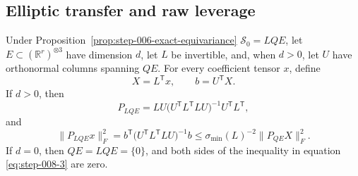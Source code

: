 \subsection{Elliptic transfer and raw leverage}\label{app:step-008}

\begin{lemma}
\label{lem:step-008-oblique-projection}
Under Proposition~\ref{prop:step-006-exact-equivariance} \(\mathscr S_0=LQE\), let
\(E\subset(\mathbb R^r)^{\otimes3}\) have dimension \(d\), let \(L\) be
invertible, and, when \(d>0\), let \(U\) have orthonormal columns spanning
\(QE\). For every coefficient tensor \(x\), define
\[
  X=L^{\mathsf T}x,
  \qquad b=U^{\mathsf T}X.
\]
If \(d>0\), then
\begin{equation}
  P_{LQE}
  =LU\bigl(U^{\mathsf T}L^{\mathsf T}LU\bigr)^{-1}
    U^{\mathsf T}L^{\mathsf T},                            \label{eq:step-008-2}
\end{equation}
and
\begin{equation}
  \|P_{LQE}x\|_F^2
  =b^{\mathsf T}\bigl(U^{\mathsf T}L^{\mathsf T}LU\bigr)^{-1}b
  \le\sigma_{\min}(L)^{-2}\|P_{QE}X\|_F^2.              \label{eq:step-008-3}
\end{equation}
If \(d=0\), then \(QE=LQE=\{0\}\), and both sides of the inequality in
equation \eqref{eq:step-008-3} are zero.

\end{lemma}

